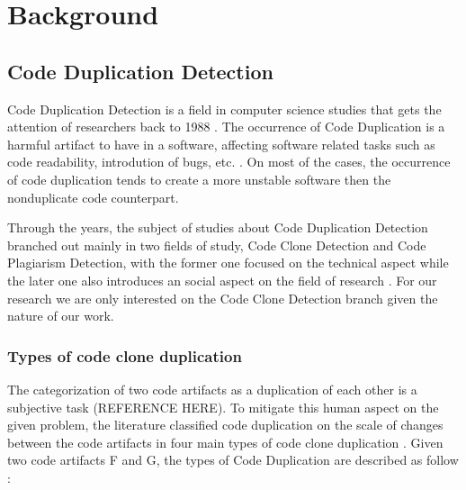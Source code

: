 
\en

\chapter{Background}

\section{Code Duplication Detection}

Code Duplication Detection is a field in computer science studies that gets the attention of researchers back to 1988 \citep{firstman}.
The occurrence of Code Duplication is a harmful artifact to have in a software, affecting software related tasks such as code readability,
introdution of bugs, etc.   \citep{harmone}. 
On most of the cases, the occurrence of code duplication tends to create a more unstable software then the nonduplicate code counterpart.   \citep{harmtwo}

Through the years, the subject of studies about Code Duplication Detection branched out mainly in two fields of study,
Code Clone Detection and Code Plagiarism Detection,
with the former one focused on the technical aspect while the later one also introduces an social aspect on the field of research
\citep{litreview}. For our research we are only interested on the Code Clone Detection branch given the nature of our work.



\subsection{Types of code clone duplication}

The categorization of two code artifacts as a duplication of each other is a subjective task (REFERENCE HERE). 
To mitigate this human aspect on the given problem, the literature classified code duplication on the scale of changes between 
the code artifacts in four main types of code clone duplication \citep{litreview}. Given two code artifacts F and G, 
the types of Code Duplication are described as follow \citep{litreview}:

